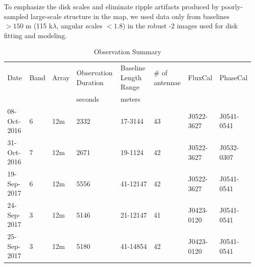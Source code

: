 \documentclass[twocolumn]{aastex61}
\let\oldarcsec\arcsec
\renewcommand\arcsec{\oldarcsec\xspace}%
\newcommand{\degrees}{\ensuremath{^{\circ}}}
\begin{document}
To emphasize the disk scales and eliminate ripple artifacts produced by
poorly-sampled large-scale structure in the map, we used data only from baselines
$>150$ m (115 k$\lambda$, angular scales $<1.8$\arcsec) in the robust -2 images
used for disk fitting and modeling.






\begin{table}[htp]
\centering
\caption{Observation Summary}
\begin{tabular}{llllllll}
\label{tab:observations}
Date & Band & Array & Observation Duration &  Baseline Length Range  & \# of antennae & FluxCal & PhaseCal\\
     &      &       & seconds              & meters                    &              &         &         \\
\hline
08-Oct-2016 & 6 & 12m & 2332 & 17-3144 & 43 & J0522-3627 & J0541-0541 \\
31-Oct-2016 & 7 & 12m & 2671 & 19-1124 & 42 & J0522-3627 & J0532-0307 \\
19-Sep-2017 & 6 & 12m & 5556 & 41-12147 & 42 & J0522-3627 & J0541-0541 \\
24-Sep-2017 & 3 & 12m & 5146 & 21-12147 & 41 & J0423-0120 & J0541-0541 \\
25-Sep-2017 & 3 & 12m & 5180 & 41-14854 & 42 & J0423-0120 & J0541-0541 \\
\hline
\end{tabular}
\end{table}
 
\end{document}
